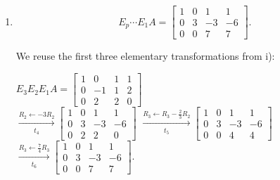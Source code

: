 \begin{enumerate}[label=\roman*)]
\begin{answer}
        Hence,

        $$
        \boxed{
        E_3E_2E_1A=
        \begin{bmatrix}
            1 & 0 & 1 & 1 \\
            0 & -1 & 1 & 2 \\
            0 & 2 & 2 & 0
        \end{bmatrix}
        }.
        $$
    \end{answer}

    \item
    $$
    E_p\cdots E_1A=
    \begin{bmatrix}
        1 & 0 & 1 & 1 \\
        0 & 3 & -3 & -6 \\
        0 & 0 & 7 & 7
    \end{bmatrix}.
    $$

    \begin{answer}
        We reuse the first three elementary
        transformations from i):

        $E_3E_2E_1A=
        \begin{bmatrix}
            1 & 0 & 1 & 1 \\
            0 & -1 & 1 & 2 \\
            0 & 2 & 2 & 0
        \end{bmatrix}
        $ \\[1.0em]

        $\xrightarrow[t_4]{R_2 \leftarrow -3R_2}
        \begin{bmatrix}
            1 & 0 & 1 & 1 \\
            0 & 3 & -3 & -6 \\
            0 & 2 & 2 & 0
        \end{bmatrix}
        $
        $\xrightarrow[t_5]{R_3 \leftarrow R_3-\frac{2}{3}R_2}
        \begin{bmatrix}
            1 & 0 & 1 & 1 \\
            0 & 3 & -3 & -6 \\
            0 & 0 & 4 & 4
        \end{bmatrix}
        $ \\[1.0em]

        $\xrightarrow[t_6]{R_3 \leftarrow \frac{7}{4}R_3}
        \begin{bmatrix}
            1 & 0 & 1 & 1 \\
            0 & 3 & -3 & -6 \\
            0 & 0 & 7 & 7
        \end{bmatrix}.
        $ \\[1.0em]


\end{answer}
\end{enumerate}
